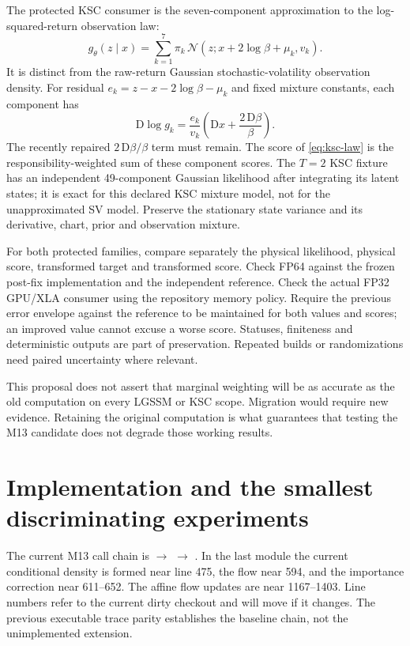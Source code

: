 \documentclass[11pt]{article}
\newcommand{\D}{\mathrm D}
\newcommand{\N}{\mathcal N}
\begin{document}
The protected KSC consumer is the seven-component approximation to the
log-squared-return observation law:
\begin{equation}
 g_\theta(z\mid x)=
       \sum_{k=1}^7\pi_k\,\N(z;x+2\log\beta+\mu_k,v_k).
 \label{eq:ksc-law}
\end{equation}
It is distinct from the raw-return Gaussian stochastic-volatility
observation density. For residual
$e_k=z-x-2\log\beta-\mu_k$ and fixed mixture constants, each component has
\begin{equation}
 \D\log g_k=\frac{e_k}{v_k}
                  \left(\D x+\frac{2\,\D\beta}{\beta}\right).
 \label{eq:ksc-tangent}
\end{equation}
The recently repaired $2\,\D\beta/\beta$ term must remain.
The score of \eqref{eq:ksc-law} is the responsibility-weighted sum of these
component scores. The $T=2$ KSC fixture has an independent 49-component
Gaussian likelihood after integrating its latent states; it is exact for
this declared KSC mixture model, not for the unapproximated SV model.
Preserve the stationary state variance and its derivative, chart,
prior and observation mixture.

For both protected families, compare separately the physical likelihood,
physical score, transformed target and transformed score. Check FP64
against the frozen post-fix implementation and the independent reference.
Check the actual FP32 GPU/XLA consumer using the repository memory policy.
Require the previous error envelope against the reference to be maintained
for both values and scores; an improved value cannot excuse a worse score.
Statuses, finiteness and deterministic outputs are part of preservation.
Repeated builds or randomizations need paired uncertainty where relevant.

This proposal does not assert that marginal weighting will be as accurate
as the old computation on every LGSSM or KSC scope. Migration would require
new evidence. Retaining the original computation is what guarantees that
testing the M13 candidate does not degrade those working results.

\section{Implementation and the smallest discriminating experiments}

The current M13 call chain is
$\to$ 
$\to$ .
In the last module the current conditional density is formed near line
475, the flow near 594, and the importance correction near 611--652.
The affine flow updates are near 1167--1403. Line numbers refer to the
current dirty checkout and will move if it changes.
The previous executable trace parity establishes the baseline chain,
not the unimplemented extension.
\end{document}
